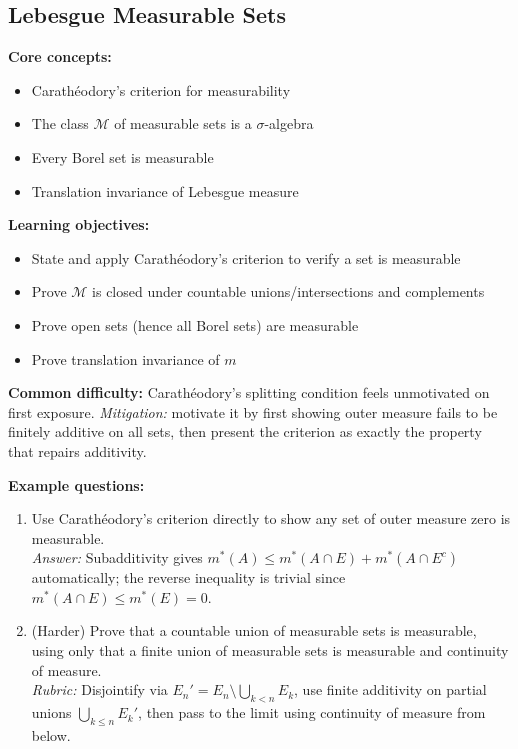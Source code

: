 \documentclass[11pt]{article}
\begin{document}
\subsection{Lebesgue Measurable Sets}

\textbf{Core concepts:}
\begin{itemize}[nosep]
\item Carath\'eodory's criterion for measurability
\item The class $\mathcal{M}$ of measurable sets is a $\sigma$-algebra
\item Every Borel set is measurable
\item Translation invariance of Lebesgue measure
\end{itemize}

\textbf{Learning objectives:}
\begin{itemize}[nosep]
\item State and apply Carath\'eodory's criterion to verify a set is measurable
\item Prove $\mathcal{M}$ is closed under countable unions/intersections and complements
\item Prove open sets (hence all Borel sets) are measurable
\item Prove translation invariance of $m$
\end{itemize}

\textbf{Common difficulty:} Carath\'eodory's splitting condition feels unmotivated on first exposure. \textit{Mitigation:} motivate it by first showing outer measure fails to be finitely additive on all sets, then present the criterion as exactly the property that repairs additivity.

\textbf{Example questions:}
\begin{enumerate}[nosep]
\item Use Carath\'eodory's criterion directly to show any set of outer measure zero is measurable. \\
\textit{Answer:} Subadditivity gives $m^*(A)\le m^*(A\cap E)+m^*(A\cap E^c)$ automatically; the reverse inequality is trivial since $m^*(A\cap E)\le m^*(E)=0$.
\item (Harder) Prove that a countable union of measurable sets is measurable, using only that a finite union of measurable sets is measurable and continuity of measure. \\
\textit{Rubric:} Disjointify via $E_n'=E_n\setminus\bigcup_{k<n}E_k$, use finite additivity on partial unions $\bigcup_{k\le n}E_k'$, then pass to the limit using continuity of measure from below.
\end{enumerate}
\end{document}
